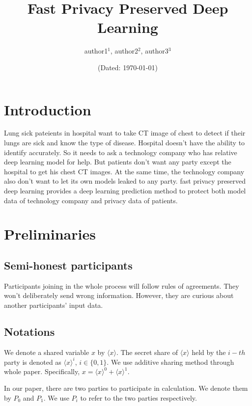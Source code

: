 \documentclass[11pt,twoside,a4paper]{article}
\title{\textbf{Fast Privacy Preserved Deep Learning}}
\author{\sffamily author1$^1$, \sffamily author2$^2$, \sffamily author3$^3$}
\date{(Dated: \today)}
\begin{document}
\maketitle

\begin{abstract}

\end{abstract}
\section{Introduction}
Lung sick pateients in hospital want to take CT image of chest to detect if their lungs are sick and know the type of disease.
Hospital doesn't have the ability to identify accurately. 
So it needs to ask a technology company who has relative deep learning model for help.
But patients don't want any party except the hospital to get his chest CT images.
At the same time, the technology company also don't want to let its own models leaked to any party.
fast privacy preserved deep learning provides a deep learning prediction method to protect both model data of technology company and privacy data of patients.

\section{Preliminaries}

\subsection{Semi-honest participants}

Participants joining in the whole process will follow rules of agreements. 
They won't deliberately send wrong information.
However, they are curious about another participants' input data.

\subsection{Notations}

We denote a shared variable $x$ by $\langle x\rangle $. 
The secret share of $\langle x\rangle $ held by the $i-th$ party is denoted as $\langle x\rangle ^{i}$, $i\in \{0,1\}$. 
We use additive sharing method through whole paper. Specifically, $x=\langle x\rangle ^{0}+\langle x\rangle ^{1}$.

In our paper, there are two parties to participate in calculation. 
We denote them by $P_{0}$ and $P_{1}$. We use $P_{i}$ to refer to the two parties respectively.
\end{document}
